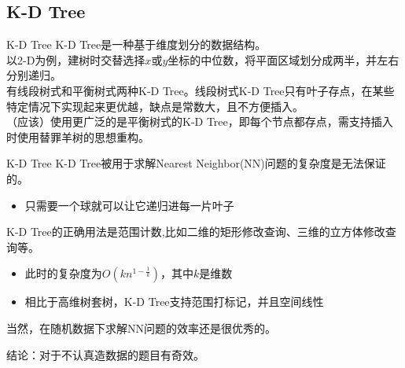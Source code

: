 \documentclass{beamer}
\begin{document}
\subsection{K-D Tree}
\begin{frame}{K-D Tree}
K-D Tree是一种基于维度划分的数据结构。\\

以2-D为例，建树时交替选择$x$或$y$坐标的中位数，将平面区域划分成两半，并左右分别递归。\\

有线段树式和平衡树式两种K-D Tree。线段树式K-D Tree只有叶子存点，在某些特定情况下实现起来更优越，缺点是常数大，且不方便插入。\\

（应该）使用更广泛的是平衡树式的K-D Tree，即每个节点都存点，需支持插入时使用替罪羊树的思想重构。\\

\end{frame}
\begin{frame}{K-D Tree}
K-D Tree被用于求解Nearest Neighbor(NN)问题的复杂度是无法保证的。
\begin{itemize}
	\item 只需要一个球就可以让它递归进每一片叶子
\end{itemize}
K-D Tree的正确用法是范围计数,比如二维的矩形修改查询、三维的立方体修改查询等。
\begin{itemize}
	\item 此时的复杂度为$O(kn^{1-\frac 1k})$，其中$k$是维数
	\item 相比于高维树套树，K-D Tree支持范围打标记，并且空间线性
\end{itemize}

当然，在随机数据下求解NN问题的效率还是很优秀的。

结论：对于不认真造数据的题目有奇效。
\end{frame}
\end{document}
